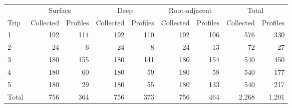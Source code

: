 \begin{tabular}{lrrrrrrrr}
\toprule
 & \multicolumn{2}{c}{Surface} & \multicolumn{2}{c}{Deep}
 & \multicolumn{2}{c}{Root-adjacent} & \multicolumn{2}{c}{Total} \\
\cmidrule(lr){2-3}\cmidrule(lr){4-5}\cmidrule(lr){6-7}\cmidrule(lr){8-9}
Trip & Collected & Profiles & Collected & Profiles
     & Collected & Profiles & Collected & Profiles \\
\midrule
1 & 192 & 114 & 192 & 110 & 192 & 106 & 576 & 330 \\
2 &  24 &   6 &  24 &   8 &  24 &  13 &  72 &  27 \\
3 & 180 & 155 & 180 & 141 & 180 & 154 & 540 & 450 \\
4 & 180 &  60 & 180 &  59 & 180 &  58 & 540 & 177 \\
5 & 180 &  29 & 180 &  55 & 180 & 133 & 540 & 217 \\
\midrule
Total & 756 & 364 & 756 & 373 & 756 & 464 & 2,268 & 1,201 \\
\bottomrule
\end{tabular}